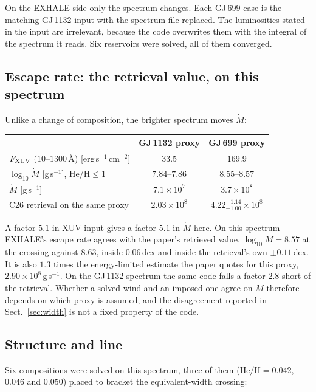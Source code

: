 \documentclass[english,a4paper]{my_memo}
\begin{document}
On the EXHALE side only the spectrum changes. Each GJ\,699 case is the
matching GJ\,1132 input with the spectrum file replaced. The luminosities
stated in the input are irrelevant, because the code overwrites them with the
integral of the spectrum it reads. Six reservoirs were solved, all of them
converged.

\subsection{Escape rate: the retrieval value, on this spectrum}

Unlike a change of composition, the brighter spectrum moves $\dot M$:

\begin{center}
\begin{tabular}{lcc}
\toprule
 & GJ\,1132 proxy & GJ\,699 proxy \\
\midrule
$F_{\rm XUV}$ ($10$--$1300$\,\AA) [erg\,s$^{-1}$\,cm$^{-2}$]
   & $33.5$ & $169.9$ \\
$\log_{10}\dot M$ [g\,s$^{-1}$], $\mathrm{He/H} \le 1$
   & $7.84$--$7.86$ & $8.55$--$8.57$ \\
$\dot M$ [g\,s$^{-1}$] & $7.1\times10^{7}$ & $3.7\times10^{8}$ \\
C26 retrieval on the same proxy & $2.03\times10^{8}$
   & $4.22^{+1.14}_{-1.00}\times10^{8}$ \\
\bottomrule
\end{tabular}
\end{center}

A factor $5.1$ in XUV input gives a factor $5.1$ in $\dot M$ here. On this
spectrum EXHALE's escape rate agrees with the paper's retrieved value,
$\log_{10}\dot M = 8.57$ at the crossing against $8.63$, inside $0.06$\,dex
and inside the retrieval's own $\pm 0.11$\,dex. It is also $1.3$ times the
energy-limited estimate the paper quotes for this proxy,
$2.90\times10^{8}$\,g\,s$^{-1}$. On the GJ\,1132 spectrum the same code falls
a factor $2.8$ short of the retrieval. Whether a solved wind and an imposed
one agree on $\dot M$ therefore depends on which proxy is assumed, and the
disagreement reported in Sect.~\ref{sec:width} is not a fixed property of the
code.

\subsection{Structure and line}

Six compositions were solved on this spectrum, three of them
($\mathrm{He/H} = 0.042$, $0.046$ and $0.050$) placed to bracket the
equivalent-width crossing:
\end{document}
